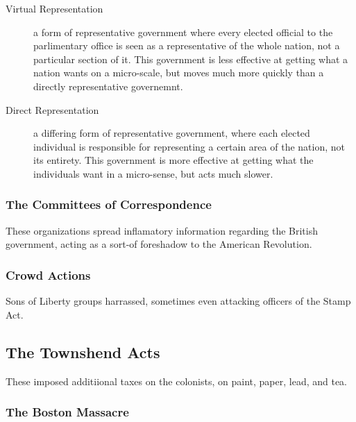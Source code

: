 \begin{description}
  \item[Virtual Representation] a form of representative government where every
    elected official to the parlimentary office is seen as a representative of
    the whole nation, not a particular section of it.   This government is
    less effective at getting what a nation wants on a micro-scale, but moves
    much more quickly than a directly representative governemnt.
  \item[Direct Representation] a differing form of representative government,
    where each elected individual is responsible for representing a certain area
    of the nation, not its entirety.  This government is more effective at
    getting what the individuals want in a micro-sense, but acts much slower.
\end{description}

\subsubsection{The Committees of Correspondence}
These organizations spread inflamatory information regarding the British
government, acting as a sort-of foreshadow to the American Revolution.

\subsubsection{Crowd Actions}
Sons of Liberty groups harrassed, sometimes even attacking officers of the Stamp
Act.

\subsection{The Townshend Acts}
These imposed additiional taxes on the colonists, on paint, paper, lead, and
tea.

\subsubsection{The Boston Massacre}
